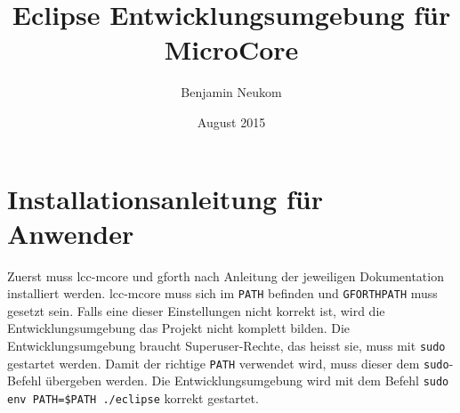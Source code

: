 \documentclass[listof=totocnumbered,bibliography=totocnumbered]{scrreprt}
\numberwithin{equation}{subsection}
\begin{document}
\subject{Bachelor-Thesis}
\title{Eclipse Entwicklungsumgebung für MicroCore}
\author{Benjamin Neukom}
\date{August 2015\\}
\publishers{Betreuer: Carlo Nicola}

\maketitle

\tableofcontents













\appendix


{}

\newpage

\listoffigures
\listoftables

\newpage
\chapter{Installationsanleitung für Anwender}
\label{chap:installuser}

Zuerst muss lcc-mcore und gforth nach Anleitung der jeweiligen Dokumentation installiert werden. lcc-mcore muss sich im \verb!PATH! befinden und \verb!GFORTHPATH! muss gesetzt sein. Falls eine dieser Einstellungen nicht korrekt ist, wird die Entwicklungsumgebung das Projekt nicht komplett bilden. Die Entwicklungsumgebung braucht Superuser-Rechte, das heisst sie, muss mit \verb!sudo! gestartet werden. Damit der richtige \verb!PATH! verwendet wird, muss dieser dem \verb!sudo!-Befehl übergeben werden. Die Entwicklungsumgebung wird mit dem Befehl \verb!sudo env PATH=$PATH ./eclipse! korrekt gestartet.
\end{document}
